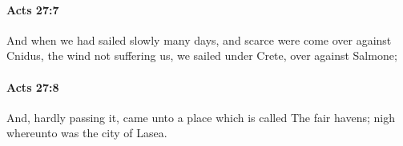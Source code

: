 		\paragraph{Acts 27:7} %
			\label{ACTS-27-7}

			And when we had sailed slowly many days, and scarce were come over against Cnidus, the wind not suffering us, we sailed under Crete, over against Salmone;

			\begin{framed}
			\scriptsize
				\begin{compactdesc}
					\item[SBLG] 
				\end{compactdesc}
			\end{framed}

		\paragraph{Acts 27:8} %
			\label{ACTS-27-8}

			And, hardly passing it, came unto a place which is called The fair havens; nigh whereunto was the city of Lasea.

